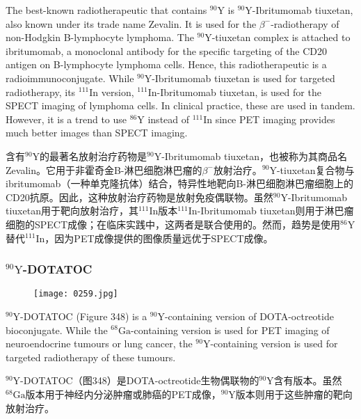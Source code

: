 \documentclass[dvipsnames, svgnames,a4paper,11pt]{article}
\begin{document}
The best-known radiotherapeutic that contains \(\mathrm{^{90}Y}\) is \(\mathrm{^{90}Y}\)-Ibritumomab tiuxetan, also known under its trade name Zevalin. It is used for the \(\beta^{-}\)-radiotherapy of non-Hodgkin B-lymphocyte lymphoma. The \(\mathrm{^{90}Y}\)-tiuxetan complex is attached to ibritumomab, a monoclonal antibody for the specific targeting of the CD20 antigen on B-lymphocyte lymphoma cells. Hence, this radiotherapeutic is a radioimmunoconjugate. While \(\mathrm{^{90}Y}\)-Ibritumomab tiuxetan is used for targeted radiotherapy, its \(\mathrm{^{111}In}\) version, \(\mathrm{^{111}In}\)-Ibritumomab tiuxetan, is used for the SPECT imaging of lymphoma cells. In clinical practice, these are used in tandem. However, it is a trend to use \(\mathrm{^{86}Y}\) instead of \(\mathrm{^{111}In}\) since PET imaging provides much better images than SPECT imaging.

含有\(\mathrm{^{90}Y}\)的最著名放射治疗药物是\(\mathrm{^{90}Y}\)-Ibritumomab tiuxetan，也被称为其商品名Zevalin。它用于非霍奇金B-淋巴细胞淋巴瘤的\(\beta^{-}\)放射治疗。\(\mathrm{^{90}Y}\)-tiuxetan复合物与ibritumomab（一种单克隆抗体）结合，特异性地靶向B-淋巴细胞淋巴瘤细胞上的CD20抗原。因此，这种放射治疗药物是放射免疫偶联物。虽然\(\mathrm{^{90}Y}\)-Ibritumomab tiuxetan用于靶向放射治疗，其\(\mathrm{^{111}In}\)版本\(\mathrm{^{111}In}\)-Ibritumomab tiuxetan则用于淋巴瘤细胞的SPECT成像；在临床实践中，这两者是联合使用的。然而，趋势是使用\(\mathrm{^{86}Y}\)替代\(\mathrm{^{111}In}\)，因为PET成像提供的图像质量远优于SPECT成像。



\subsubsection{\(\mathrm{^{90}Y}\)-DOTATOC}

\begin{figure}[h]
    \centering
    \texttt{[image: 0259.jpg]}
     \label{fig348}
\end{figure}

\(\mathrm{^{90}Y}\)-DOTATOC (Figure 348) is a \(\mathrm{^{90}Y}\)-containing version of DOTA-octreotide bioconjugate. While the \(\mathrm{^{68}Ga}\)-containing version is used for PET imaging of neuroendocrine tumours or lung cancer, the \(\mathrm{^{90}Y}\)-containing version is used for targeted radiotherapy of these tumours.

\(\mathrm{^{90}Y}\)-DOTATOC（图348）是DOTA-octreotide生物偶联物的\(\mathrm{^{90}Y}\)含有版本。虽然\(\mathrm{^{68}Ga}\)版本用于神经内分泌肿瘤或肺癌的PET成像，\(\mathrm{^{90}Y}\)版本则用于这些肿瘤的靶向放射治疗。
\end{document}
